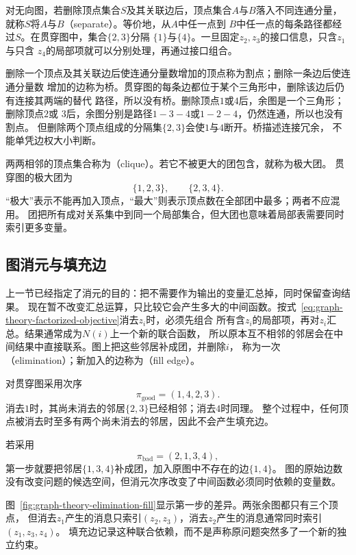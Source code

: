 对无向图，若删除顶点集合\(S\)及其关联边后，顶点集合\(A\)与\(B\)落入不同连通分量，
就称\(S\)将\(A\)与\(B\)（separate）。等价地，从\(A\)中任一点到
\(B\)中任一点的每条路径都经过\(S\)。在贯穿图中，集合\(\{2,3\}\)分隔
\(\{1\}\)与\(\{4\}\)。一旦固定\(z_2,z_3\)的接口信息，只含\(z_1\)与只含
\(z_4\)的局部项就可以分别处理，再通过接口组合。

删除一个顶点及其关联边后使连通分量数增加的顶点称为割点；删除一条边后使连通分量数
增加的边称为桥。贯穿图的每条边都位于某个三角形中，删除该边后仍有连接其两端的替代
路径，所以没有桥。删除顶点\(1\)或\(4\)后，余图是一个三角形；删除顶点\(2\)或
\(3\)后，余图分别是路径\(1-3-4\)或\(1-2-4\)，仍然连通，所以也没有割点。
但删除两个顶点组成的分隔集\(\{2,3\}\)会使\(1\)与\(4\)断开。桥描述连接冗余，
不能单凭边权大小判断。

两两相邻的顶点集合称为（clique）。若它不被更大的团包含，就称为极大团。
贯穿图的极大团为
\[
  \{1,2,3\},\qquad \{2,3,4\}.
\]
“极大”表示不能再加入顶点，“最大”则表示顶点数在全部团中最多；两者不应混用。
团把所有成对关系集中到同一个局部集合，但大团也意味着局部表需要同时索引更多变量。

\subsection{图消元与填充边}
\label{sec:graph-theory-elimination-width}

上一节已经指定了消元的目的：把不需要作为输出的变量汇总掉，同时保留查询结果。
现在暂不改变汇总运算，只比较它会产生多大的中间函数。按式~\eqref{eq:graph-theory-factorized-objective}消去\(z_i\)时，必须先组合
所有含\(z_i\)的局部项，再对\(z_i\)汇总。结果通常成为\(N(i)\)上一个新的联合函数，
所以原本互不相邻的邻居会在中间结果中直接联系。图上把这些邻居补成团，并删除\(i\)，
称为一次（elimination）；新加入的边称为（fill edge）。

对贯穿图采用次序
\[
  \pi_{\mathrm{good}}=(1,4,2,3).
\]
消去\(1\)时，其尚未消去的邻居\(\{2,3\}\)已经相邻；消去\(4\)时同理。
整个过程中，任何顶点被消去时至多有两个尚未消去的邻居，因此不会产生填充边。

若采用
\[
  \pi_{\mathrm{bad}}=(2,1,3,4),
\]
第一步就要把邻居\(\{1,3,4\}\)补成团，加入原图中不存在的边\(\{1,4\}\)。
图的原始边数没有改变问题的候选空间，但消元次序改变了中间函数必须同时依赖的变量数。

图~\ref{fig:graph-theory-elimination-fill}显示第一步的差异。两张余图都只有三个顶点，
但消去\(z_1\)产生的消息只索引\((z_2,z_3)\)，消去\(z_2\)产生的消息通常同时索引\((z_1,z_3,z_4)\)。
填充边记录这种联合依赖，而不是声称原问题突然多了一个新的独立约束。

